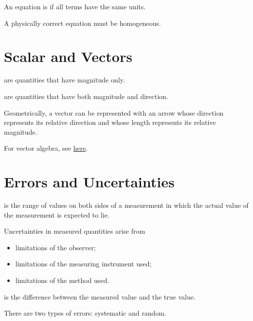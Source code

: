 \begin{definition}
    An equation is  if all terms have the same units.
\end{definition}

A physically correct equation must be homogeneous.

\section{Scalar and Vectors}

\begin{definition}
     are quantities that have magnitude only.
\end{definition}

\begin{definition}
     are quantities that have both magnitude and direction.
\end{definition}

Geometrically, a vector can be represented with an arrow whose direction represents its relative direction and whose length represents its relative magnitude.

For vector algebra, see \href{https://asdia.dev/projects/triplemath/docs/TripleMath.pdf#chapter.8}{here}.

\section{Errors and Uncertainties}

\begin{definition}
     is the range of values on both sides of a measurement in which the actual value of the measurement is expected to lie.
\end{definition}

Uncertainties in measured quantities arise from
\begin{itemize}
    \item limitations of the observer;
    \item limitations of the measuring instrument used;
    \item limitations of the method used.
\end{itemize}

\begin{definition}
     is the difference between the measured value and the true value.
\end{definition}

There are two types of errors: systematic and random.

